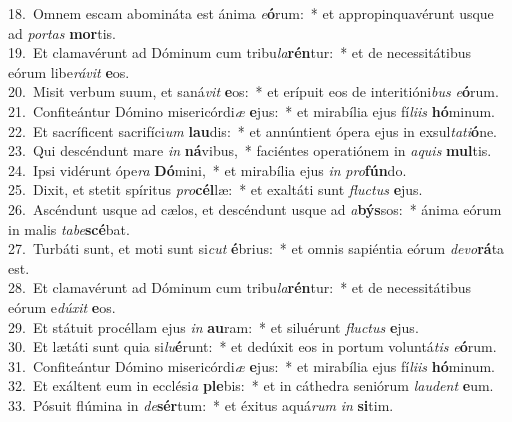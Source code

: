 {18.~}Omnem escam abomináta est ánima \textit{e}\textbf{ó}rum:~* et appropinquavérunt usque ad \textit{por}\textit{tas} \textbf{mor}tis.\\
{19.~}Et clamavérunt ad Dóminum cum tribu\textit{la}\textbf{rén}tur:~* et de necessitátibus eórum libe\textit{rá}\textit{vit} \textbf{e}os.\\
{20.~}Misit verbum suum, et saná\textit{vit} \textbf{e}os:~* et erípuit eos de interitióni\textit{bus} \textit{e}\textbf{ó}rum.\\
{21.~}Confiteántur Dómino misericórdi\textit{æ} \textbf{e}jus:~* et mirabília ejus fí\textit{li}\textit{is} \textbf{hó}minum.\\
{22.~}Et sacríficent sacrifíci\textit{um} \textbf{lau}dis:~* et annúntient ópera ejus in exsul\textit{ta}\textit{ti}\textbf{ó}ne.\\
{23.~}Qui descéndunt mare \textit{in} \textbf{ná}vibus,~* faciéntes operatiónem in \textit{a}\textit{quis} \textbf{mul}tis.\\
{24.~}Ipsi vidérunt ópe\textit{ra} \textbf{Dó}mini,~* et mirabília ejus \textit{in} \textit{pro}\textbf{fún}do.\\
{25.~}Dixit, et stetit spíritus \textit{pro}\textbf{cél}læ:~* et exaltáti sunt \textit{flu}\textit{ctus} \textbf{e}jus.\\
{26.~}Ascéndunt usque ad cælos, et descéndunt usque ad \textit{a}\textbf{býs}sos:~* ánima eórum in malis \textit{ta}\textit{be}\textbf{scé}bat.\\
{27.~}Turbáti sunt, et moti sunt si\textit{cut} \textbf{é}brius:~* et omnis sapiéntia eórum \textit{de}\textit{vo}\textbf{rá}ta est.\\
{28.~}Et clamavérunt ad Dóminum cum tribu\textit{la}\textbf{rén}tur:~* et de necessitátibus eórum e\textit{dú}\textit{xit} \textbf{e}os.\\
{29.~}Et státuit procéllam ejus \textit{in} \textbf{au}ram:~* et siluérunt \textit{flu}\textit{ctus} \textbf{e}jus.\\
{30.~}Et lætáti sunt quia si\textit{lu}\textbf{é}runt:~* et dedúxit eos in portum voluntá\textit{tis} \textit{e}\textbf{ó}rum.\\
{31.~}Confiteántur Dómino misericórdi\textit{æ} \textbf{e}jus:~* et mirabília ejus fí\textit{li}\textit{is} \textbf{hó}minum.\\
{32.~}Et exáltent eum in ecclési\textit{a} \textbf{ple}bis:~* et in cáthedra seniórum \textit{lau}\textit{dent} \textbf{e}um.\\
{33.~}Pósuit flúmina in \textit{de}\textbf{sér}tum:~* et éxitus aquá\textit{rum} \textit{in} \textbf{si}tim.\\
